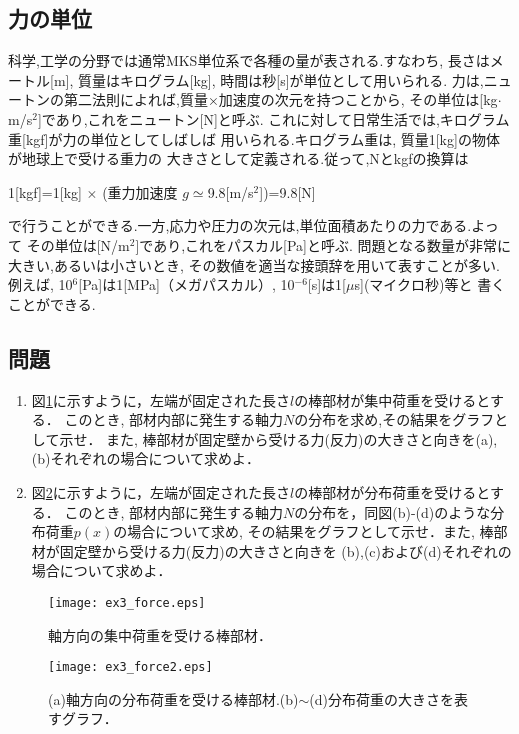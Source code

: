 \documentclass[10pt,a4j]{jbook}
\begin{document}
\subsection{力の単位}
科学,工学の分野では通常MKS単位系で各種の量が表される.すなわち, 
長さはメートル[m], 質量はキログラム[kg], 時間は秒[s]が単位として用いられる.
力は,ニュートンの第二法則によれば,質量×加速度の次元を持つことから, 
その単位は[kg$\cdot$m/s$^2$]であり,これをニュートン[N]と呼ぶ.
これに対して日常生活では,キログラム重[kgf]が力の単位としてしばしば
用いられる.キログラム重は, 質量1[kg]の物体が地球上で受ける重力の
大きさとして定義される.従って,Nとkgfの換算は
\begin{center}
	1[kgf]=1[kg] $\times$ (重力加速度  $g\simeq$9.8[m/s$^2$])=9.8[N]
\end{center}
で行うことができる.一方,応力や圧力の次元は,単位面積あたりの力である.よって
その単位は[N/m$^2$]であり,これをパスカル[Pa]と呼ぶ.
問題となる数量が非常に大きい,あるいは小さいとき,
その数値を適当な接頭辞を用いて表すことが多い.例えば,
10$^6$[Pa]は1[MPa]（メガパスカル）, 10$^{-6}$[s]は1[$\mu$s](マイクロ秒)等と
書くことができる.
\subsection{問題}
\begin{enumerate}
\item
図\ref{fig:fig3}に示すように，左端が固定された長さ$l$の棒部材が集中荷重を受けるとする．
このとき, 部材内部に発生する軸力$N$の分布を求め,その結果をグラフとして示せ．
また, 棒部材が固定壁から受ける力(反力)の大きさと向きを(a),(b)それぞれの場合について求めよ．
\item
図\ref{fig:fig3_2}に示すように，左端が固定された長さ$l$の棒部材が分布荷重を受けるとする．
このとき, 部材内部に発生する軸力$N$の分布を，同図(b)-(d)のような分布荷重$p(x)$の場合について求め,
その結果をグラフとして示せ．また, 棒部材が固定壁から受ける力(反力)の大きさと向きを
(b),(c)および(d)それぞれの場合について求めよ．
\end{enumerate}
\begin{figure}[h]
	\begin{center}
	\texttt{[image: ex3\_force.eps]} 
	\end{center}
	\caption{軸方向の集中荷重を受ける棒部材．} 
	\label{fig:fig3}
\end{figure}
\begin{figure}[h]
	\begin{center}
	\texttt{[image: ex3\_force2.eps]} 
	\end{center}
	\caption{(a)軸方向の分布荷重を受ける棒部材.(b)$\sim$(d)分布荷重の大きさを表すグラフ．} 
	\label{fig:fig3_2}
\end{figure}
\end{document}
